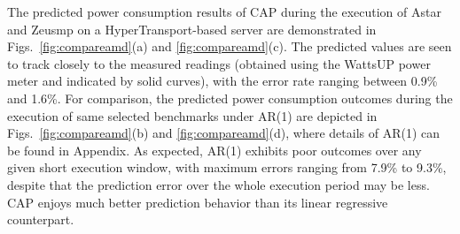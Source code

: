 \documentclass[prodmode,acmtaco,pdftex]{acmsmall}
\newcommand{\figurenames}{Figs.}
\begin{document}
The predicted power consumption results of CAP during the execution of
Astar and Zeusmp on a HyperTransport-based server are demonstrated in
\figurenames~\ref{fig:compareamd}(a) and \ref{fig:compareamd}(c).  The
predicted values are seen to track closely to the measured readings
(obtained using the WattsUP power meter and indicated by solid curves),
with the error rate ranging between 0.9\% and 1.6\%.  For comparison,
the predicted power consumption outcomes during the execution of same
selected benchmarks under AR(1) are depicted in
\figurenames~\ref{fig:compareamd}(b) and \ref{fig:compareamd}(d), where
details of AR(1) can be found in Appendix.  As expected, AR(1) exhibits
poor outcomes over any given short execution window, with maximum errors
ranging from 7.9\% to 9.3\%, despite that the prediction error over the
whole execution period may be less.  CAP enjoys much better prediction
behavior than its linear regressive counterpart.
\end{document}
